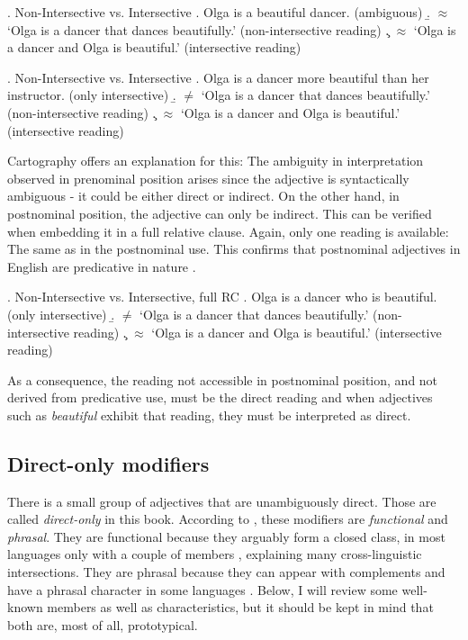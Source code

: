 \ex. \label{ambiguous, beautiful} Non-Intersective vs. Intersective \citep[145]{larson:1995:olga}
\a. Olga is a beautiful dancer. (ambiguous) \label{olga}
\b. $\approx$ `Olga is a dancer that dances beautifully.’ (non-intersective reading)
\c. $\approx$ `Olga is a dancer and Olga is beautiful.’ (intersective reading)

\ex. Non-Intersective vs. Intersective \citep[9]{cinque:2010:adj}
\a. Olga is a dancer more beautiful than her instructor. (only intersective)
\b. $\neq$ `Olga is a dancer that dances beautifully.’ (non-intersective reading)
\c. $\approx$ `Olga is a dancer and Olga is beautiful.’ (intersective reading) \label{intersective, RC}

Cartography offers an explanation for this: The ambiguity in interpretation observed in prenominal position arises since the adjective is syntactically ambiguous - it could be either direct or indirect. On the other hand, in postnominal position, the adjective can only be indirect. This can be verified when embedding it in a full relative clause. Again, only one reading is available: The same as in the postnominal use. This confirms that postnominal adjectives in  English are predicative in nature \citep[18–19]{cinque:2010:adj}.

\ex. Non-Intersective vs. Intersective, full RC \citep[9]{cinque:2010:adj}
\a. Olga is a dancer who is beautiful. (only intersective)
\b. $\neq$ `Olga is a dancer that dances beautifully.’ (non-intersective reading)
\c. $\approx$ `Olga is a dancer and Olga is beautiful.’ (intersective reading)

As a consequence, the reading not accessible in postnominal position, and not derived from predicative use, must be the direct reading and when adjectives such as \textit{beautiful} exhibit that reading, they must be interpreted as direct.

\subsection{Direct-only modifiers}

There is a small group of adjectives that are unambiguously direct. Those are called \textit{direct-only} in this book. According to \citet[§ 4.1]{cinque:2010:adj}, these modifiers are \textit{functional} and \textit{phrasal}. They are functional because they arguably form a closed class, in most languages only with a couple of members \citep[43–44]{cinque:2010:adj}, explaining many cross-linguistic intersections. They are phrasal because they can appear with complements and have a phrasal character in some languages \citep[44–49]{cinque:2010:adj}. Below, I will review some well-known members as well as characteristics, but it should be kept in mind that both are, most of all, prototypical.


